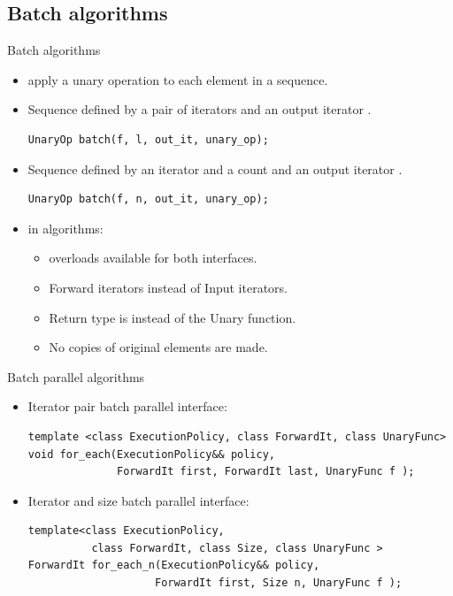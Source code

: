  \subsection{Batch algorithms}

\begin{frame}[t,fragile]{Batch algorithms}
\begin{itemize}
  \item {} apply a unary operation to each element in a sequence.
  
    \item Sequence defined by a pair of iterators \cppcode{[f, l)} and an output iterator .
\begin{lstlisting}
UnaryOp batch(f, l, out_it, unary_op);
\end{lstlisting}
    \item Sequence defined by an iterator  and a count  and an output iterator .
\begin{lstlisting}
UnaryOp batch(f, n, out_it, unary_op);
\end{lstlisting}

    \item {} in  algorithms:
    \begin{itemize}
      \item {} overloads available for both interfaces.
      \item Forward iterators instead of Input iterators.
      \item Return type is  instead of the Unary function.
      \item No copies of original elements are made.
    \end{itemize}
\end{itemize}
\end{frame}

\begin{frame}[t,fragile]{Batch parallel algorithms}
  \begin{itemize}
    \item Iterator pair batch parallel interface:
\begin{lstlisting}
template <class ExecutionPolicy, class ForwardIt, class UnaryFunc>
void for_each(ExecutionPolicy&& policy,
              ForwardIt first, ForwardIt last, UnaryFunc f );
\end{lstlisting}

    \item Iterator and size batch parallel interface:
\begin{lstlisting}
template<class ExecutionPolicy,
          class ForwardIt, class Size, class UnaryFunc >
ForwardIt for_each_n(ExecutionPolicy&& policy,
                    ForwardIt first, Size n, UnaryFunc f );
\end{lstlisting}
\end{itemize}
\end{frame}


